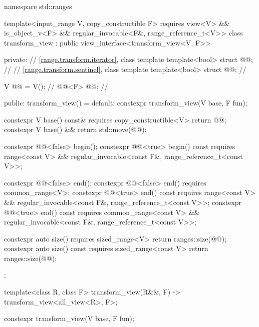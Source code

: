 %
%
%
\begin{codeblock}
namespace std::ranges {
  template<input_range V, copy_constructible F>
    requires view<V> && is_object_v<F> &&
             regular_invocable<F&, range_reference_t<V>>
  class transform_view : public view_interface<transform_view<V, F>> {
  private:
    // \ref{range.transform.iterator}, class template 
    template<bool> struct @@;             // \expos
    // \ref{range.transform.sentinel}, class template 
    template<bool> struct @@;             // \expos

    V @@ = V();                              // \expos
    @@<F> @@;                    // \expos

  public:
    transform_view() = default;
    constexpr transform_view(V base, F fun);

    constexpr V base() const& requires copy_constructible<V> { return @@; }
    constexpr V base() && { return std::move(@@); }

    constexpr @@<false> begin();
    constexpr @@<true> begin() const
      requires range<const V> &&
               regular_invocable<const F&, range_reference_t<const V>>;

    constexpr @@<false> end();
    constexpr @@<false> end() requires common_range<V>;
    constexpr @@<true> end() const
      requires range<const V> &&
               regular_invocable<const F&, range_reference_t<const V>>;
    constexpr @@<true> end() const
      requires common_range<const V> &&
               regular_invocable<const F&, range_reference_t<const V>>;

    constexpr auto size() requires sized_range<V> { return ranges::size(@@); }
    constexpr auto size() const requires sized_range<const V>
    { return ranges::size(@@); }
  };

  template<class R, class F>
    transform_view(R&&, F) -> transform_view<all_view<R>, F>;
}
\end{codeblock}

%
\begin{itemdecl}
constexpr transform_view(V base, F fun);
\end{itemdecl}

